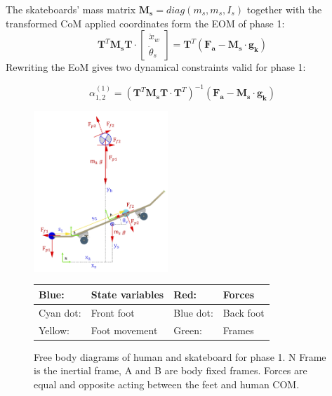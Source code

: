 \documentclass[default,iicol]{sn-jnl}
\begin{document}
The skateboards' mass matrix $\mathbf{M_s} = diag(m_s,m_s,I_s)$ together with the transformed CoM applied coordinates form the EOM of phase 1:
\begin{equation} \label{e_eoma}
    \mathbf{T}^T \mathbf{M_s} \mathbf{T} \cdot \left[\begin{array}{c}
         \ddot x_w  \\
         \ddot \theta_s 
    \end{array}\right] = \mathbf{T}^T (\mathbf{F_a} - \mathbf{M_s} \cdot \mathbf{g_k})
\end{equation}
Rewriting the EoM gives two dynamical constraints valid for phase 1:

\begin{equation}
    \alpha_{1,2}^{(1)} =   \left(\mathbf{T}^T \mathbf{M_s} \mathbf{T} \cdot  \mathbf{T}^T\right)^{-1} (\mathbf{F_a} - \mathbf{M_s} \cdot \mathbf{g_k})
\end{equation}

\begin{figure}
    \centering
    \includegraphics[width=0.45\textwidth]{figure/FBD_skater_feet.png}
    \footnotesize\begin{tabular}{|l l|l l|} \hline
    \color{blue}Blue: & State variables &\color{red} Red: & Forces \\ \hline
    \color{cyan}Cyan dot: & Front foot & \color{blue}Blue dot: & Back foot \\ \hline
    \color{yellow}Yellow: & Foot movement & \color{green}Green: & Frames \\ \hline
    \end{tabular}
    \caption[Free Body Diagrams phase 2 and 3]{Free body diagrams of human and skateboard for phase 1. N Frame is the inertial frame, A and B are body fixed frames. Forces are equal and opposite acting between the feet and human COM.}
    \label{f_FBD}
\end{figure}
\end{document}
